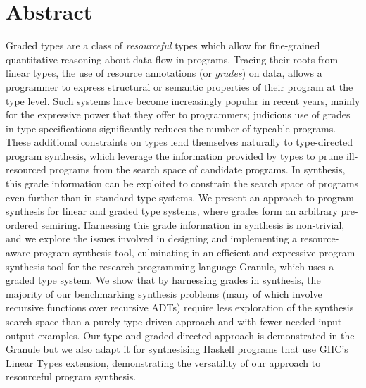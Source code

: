 \begingroup
\let\clearpage\relax
\let\cleardoublepage\relax
\let\cleardoublepage\relax

\chapter*{Abstract}
Graded types are a class of \textit{resourceful} types which allow for
fine-grained quantitative reasoning about data-flow in programs. Tracing their
roots from linear types, the use of resource annotations (or \textit{grades}) on
data, allows a programmer to express structural or semantic properties of their
program at the type level. Such systems have become increasingly popular in
recent years, mainly for the expressive power that they offer to programmers;
judicious use of grades in type specifications significantly reduces the number
of typeable programs. These additional constraints on types lend themselves
naturally to type-directed program synthesis, which leverage the information
provided by types to prune ill-resourced programs from the search space of
candidate programs. In synthesis, this grade information can be
exploited to constrain the search space of programs even further than in
standard type systems. We present an approach to program synthesis for linear
and graded type systems, where grades form an arbitrary pre-ordered semiring.
Harnessing this grade information in synthesis is non-trivial, and we explore
the issues involved in designing and implementing a resource-aware program
synthesis tool, culminating in an efficient and expressive program synthesis
tool for the research programming language Granule, which uses a graded type
system. We show that by harnessing grades in synthesis, the majority of our
benchmarking synthesis problems (many of which involve recursive functions over
recursive ADTs) require less exploration of the synthesis search space than a
purely type-driven approach and with fewer needed input-output examples. Our
type-and-graded-directed approach is demonstrated in the Granule but we also
adapt it for synthesising Haskell programs that use GHC's Linear Types extension,
demonstrating the versatility of our approach to resourceful program synthesis. 


\vfill

\endgroup

\vfill
